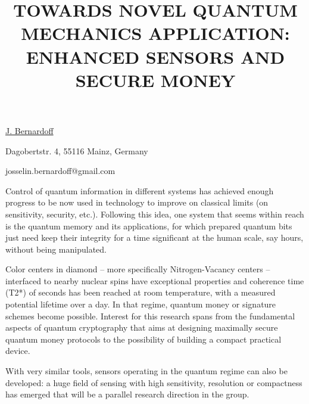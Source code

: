 \title{TOWARDS NOVEL QUANTUM MECHANICS APPLICATION: ENHANCED SENSORS AND SECURE MONEY}

\underline{J. Bernardoff} 

{\normalsize{\vspace{-4mm}
Dagobertstr. 4,
55116 Mainz, Germany


\email josselin.bernardoff@gmail.com}}

Control of quantum information in different systems has achieved enough progress to be now used in
technology to improve on classical limits (on sensitivity, security, etc.). Following this idea, one
system that seems within reach is the quantum memory and its applications, for which prepared
quantum bits just need keep their integrity for a time significant at the human scale, say hours,
without being manipulated.

Color centers in diamond -- more specifically Nitrogen-Vacancy centers -- interfaced to nearby nuclear
spins have exceptional properties and coherence time (T2*) of seconds has been reached at room
temperature, with a measured potential lifetime over a day. In that regime, quantum money or
signature schemes become possible. Interest for this research spans from the fundamental aspects of
quantum cryptography that aims at designing maximally secure quantum money protocols to the
possibility of building a compact practical device.

With very similar tools, sensors operating in the quantum regime can also be developed: a huge
field of sensing with high sensitivity, resolution or compactness has emerged that will be a
parallel research direction in the group.

\vspace{\baselineskip}
